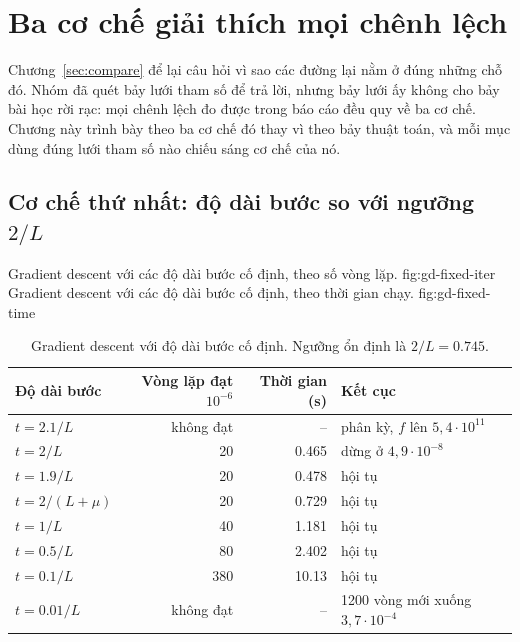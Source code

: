 \chapter{Ba cơ chế giải thích mọi chênh lệch}
\label{sec:mechanisms}

Chương~\ref{sec:compare} để lại câu hỏi vì sao các đường lại nằm ở đúng những chỗ
đó. Nhóm đã quét bảy lưới tham số để trả lời, nhưng bảy lưới ấy không cho bảy bài
học rời rạc: mọi chênh lệch đo được trong báo cáo đều quy về ba cơ chế. Chương
này trình bày theo ba cơ chế đó thay vì theo bảy thuật toán, và mỗi mục dùng đúng
lưới tham số nào chiếu sáng cơ chế của nó.

\section{Cơ chế thứ nhất: độ dài bước so với ngưỡng \texorpdfstring{$2/L$}{2/L}}
\label{sec:mech-step}

  {Gradient descent với các độ dài bước cố định, theo số vòng lặp.}
  {fig:gd-fixed-iter}
  {Gradient descent với các độ dài bước cố định, theo thời gian chạy.}
  {fig:gd-fixed-time}

\begin{table}[tp]
  \centering
  \caption{Gradient descent với độ dài bước cố định. Ngưỡng ổn định là
    $2/L = \num{0.745}$.}
  \label{tab:gd-fixed}
  \begin{tabular}{lrrl}
    \toprule
    Độ dài bước & Vòng lặp đạt $10^{-6}$ & Thời gian (s) & Kết cục \\
    \midrule
    $t = 2.1/L$      & không đạt & --           & phân kỳ, $f$ lên $5{,}4 \cdot 10^{11}$ \\
    $t = 2/L$        & 20        & \num{0.465}  & dừng ở $4{,}9 \cdot 10^{-8}$ \\
    $t = 1.9/L$      & 20        & \num{0.478}  & hội tụ \\
    $t = 2/(L+\mu)$  & 20        & \num{0.729}  & hội tụ \\
    $t = 1/L$        & 40        & \num{1.181}  & hội tụ \\
    $t = 0.5/L$      & 80        & \num{2.402}  & hội tụ \\
    $t = 0.1/L$      & 380       & \num{10.13}  & hội tụ \\
    $t = 0.01/L$     & không đạt & --           & 1200 vòng mới xuống $3{,}7 \cdot 10^{-4}$ \\
    \bottomrule
  \end{tabular}
\end{table}

